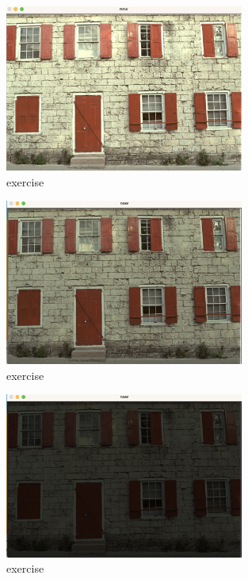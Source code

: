 \documentclass{article}
\begin{document}
\begin{figure}[H]
	\centering
	\includegraphics[width=0.7\textwidth]{9.png}
	\caption{\label{pr1}exercise}
	\end{figure}

	\begin{figure}[H]
		\centering
		\includegraphics[width=0.7\textwidth]{10.png}
		\caption{\label{pr1}exercise}
		\end{figure}

		\begin{figure}[H]
			\centering
			\includegraphics[width=0.7\textwidth]{11.png}
			\caption{\label{pr1}exercise}
			\end{figure}
\end{document}
